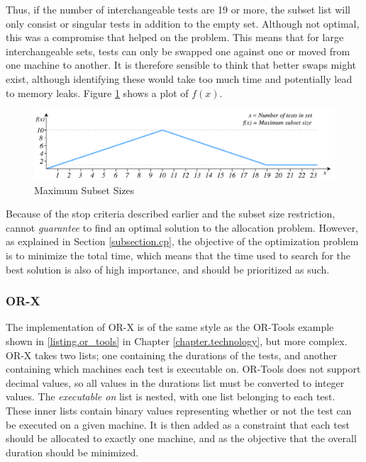 Thus, if the number of interchangeable tests are 19 or more, the subset list will only consist or singular tests in addition to the empty set. Although not optimal, this was a compromise that helped on the problem. This means that for large interchangeable sets, tests can only be swapped one against one or moved from one machine to another. It is therefore sensible to think that better swaps might exist, although identifying these would take too much time and potentially lead to memory leaks.  Figure \ref{fig.subsets} shows a plot of $f(x)$.

\begin{figure}[h]
    \centering
    \includegraphics[width=\textwidth]{figures/new/subset_sizes.pdf}
    \caption{Maximum Subset Sizes}
    \label{fig.subsets}
\end{figure}

Because of the stop criteria described earlier and the subset size restriction, \toolname \space cannot \emph{guarantee} to find an optimal solution to the allocation problem. However, as explained in Section \ref{subsection.cp}, the objective of the optimization problem is to minimize the total time, which means that the time used to search for the best solution is also of high importance, and should be prioritized as such.

\subsubsection{OR-X}

The implementation of OR-X is of the same style as the OR-Tools example shown in \lstlistingname \space \ref{listing.or_tools} in Chapter \ref{chapter.technology}, but more complex. OR-X takes two lists; one containing the durations of the tests, and another containing which machines each test is executable on. OR-Tools does not support decimal values, so all values in the durations list must be converted to integer values. The \emph{executable on} list is nested, with one list belonging to each test. These inner lists contain binary values representing whether or not the test can be executed on a given machine. It is then added as a constraint that each test should be allocated to exactly one machine, and as the objective that the overall duration should be minimized.

